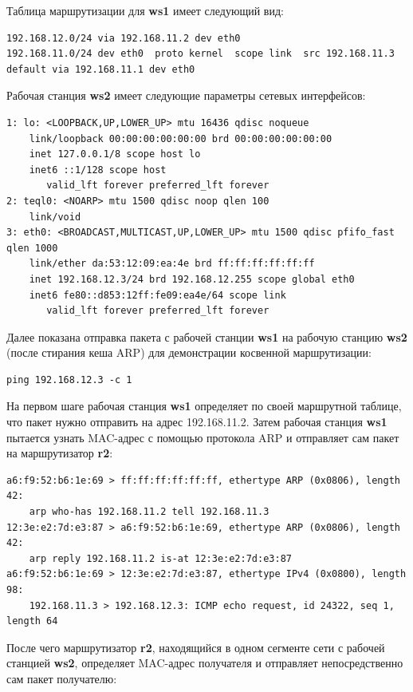 \documentclass[a4paper,12pt]{article}
\begin{document}
Таблица маршрутизации для \textbf{ws1} имеет следующий вид:

\begin{Verbatim}
192.168.12.0/24 via 192.168.11.2 dev eth0 
192.168.11.0/24 dev eth0  proto kernel  scope link  src 192.168.11.3 
default via 192.168.11.1 dev eth0
\end{Verbatim}

Рабочая станция \textbf{ws2} имеет следующие параметры сетевых интерфейсов:

\begin{Verbatim}
1: lo: <LOOPBACK,UP,LOWER_UP> mtu 16436 qdisc noqueue 
    link/loopback 00:00:00:00:00:00 brd 00:00:00:00:00:00
    inet 127.0.0.1/8 scope host lo
    inet6 ::1/128 scope host 
       valid_lft forever preferred_lft forever
2: teql0: <NOARP> mtu 1500 qdisc noop qlen 100
    link/void 
3: eth0: <BROADCAST,MULTICAST,UP,LOWER_UP> mtu 1500 qdisc pfifo_fast qlen 1000
    link/ether da:53:12:09:ea:4e brd ff:ff:ff:ff:ff:ff
    inet 192.168.12.3/24 brd 192.168.12.255 scope global eth0
    inet6 fe80::d853:12ff:fe09:ea4e/64 scope link 
       valid_lft forever preferred_lft forever
\end{Verbatim}

Далее показана отправка пакета с рабочей станции \textbf{ws1} на рабочую станцию
\textbf{ws2} (после стирания кеша ARP) для демонстрации косвенной маршрутизации:

\begin{Verbatim}
ping 192.168.12.3 -c 1
\end{Verbatim}

На первом шаге рабочая станция \textbf{ws1} определяет по своей маршрутной таблице,
что пакет нужно отправить на адрес 192.168.11.2. Затем рабочая станция \textbf{ws1} 
пытается узнать MAC-адрес с помощью протокола ARP и отправляет сам пакет на
маршрутизатор \textbf{r2}:

\begin{Verbatim}
a6:f9:52:b6:1e:69 > ff:ff:ff:ff:ff:ff, ethertype ARP (0x0806), length 42:
    arp who-has 192.168.11.2 tell 192.168.11.3
12:3e:e2:7d:e3:87 > a6:f9:52:b6:1e:69, ethertype ARP (0x0806), length 42:
    arp reply 192.168.11.2 is-at 12:3e:e2:7d:e3:87
a6:f9:52:b6:1e:69 > 12:3e:e2:7d:e3:87, ethertype IPv4 (0x0800), length 98:
    192.168.11.3 > 192.168.12.3: ICMP echo request, id 24322, seq 1, length 64
\end{Verbatim}

После чего маршрутизатор \textbf{r2}, находящийся в одном сегменте сети с рабочей
станцией \textbf{ws2}, определяет MAC-адрес получателя и отправляет непосредственно
сам пакет получателю:
\end{document}
